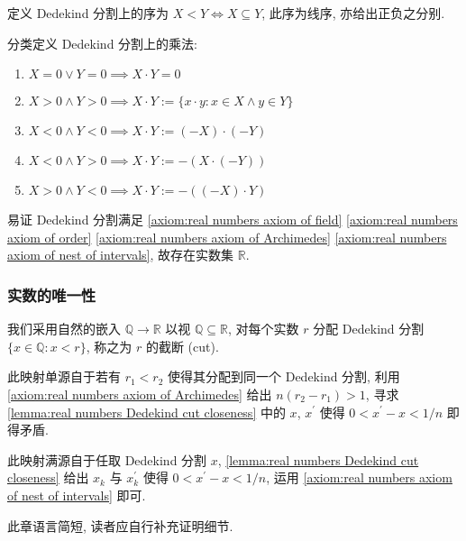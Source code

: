 \begin{definition}
    定义 Dedekind 分割上的序为 \(X < Y \iff X \subseteq Y\), 此序为线序, 亦给出正负之分别.
\end{definition}

\begin{definition}
    分类定义 Dedekind 分割上的乘法:
    \begin{enumerate}
        \item \(X = 0 \lor Y = 0 \implies X \cdot Y = 0\)
        \item \(X > 0 \land Y > 0 \implies X \cdot Y := \{x \cdot y : x \in X \land y \in Y\}\)
        \item \(X < 0 \land Y < 0 \implies X \cdot Y := (-X) \cdot (-Y)\)
        \item \(X < 0 \land Y > 0 \implies X \cdot Y := -(X \cdot (-Y))\)
        \item \(X > 0 \land Y < 0 \implies X \cdot Y := -((-X) \cdot Y)\)
    \end{enumerate}
\end{definition}

\begin{corollary}
    易证 Dedekind 分割满足 \ref{axiom:real numbers axiom of field} \ref{axiom:real numbers axiom of order} \ref{axiom:real numbers axiom of Archimedes} \ref{axiom:real numbers axiom of nest of intervals},
    故存在实数集 \(\mathbb{R}\).
\end{corollary}

\subsubsection{实数的唯一性}

我们采用自然的嵌入 \(\mathbb{Q} \to \mathbb{R}\) 以视 \(\mathbb{Q} \subseteq \mathbb{R}\),
对每个实数 \(r\) 分配 Dedekind 分割 \(\{x \in \mathbb{Q} : x < r\}\), 称之为 \(r\) 的截断 (cut).

此映射单源自于若有 \(r_1 < r_2\) 使得其分配到同一个 Dedekind 分割,
利用 \ref{axiom:real numbers axiom of Archimedes} 给出 \(n (r_2 - r_1) > 1\),
寻求 \ref{lemma:real numbers Dedekind cut closeness} 中的 \(x\), \(x^\prime\) 使得 \(0 < x^\prime - x < 1 / n\) 即得矛盾.

此映射满源自于任取 Dedekind 分割 \(x\), \ref{lemma:real numbers Dedekind cut closeness} 
给出 \(x_k\) 与 \(x_k^\prime\) 使得 \(0 < x^\prime - x < 1 / n\), 运用 \ref{axiom:real numbers axiom of nest of intervals} 即可.

此章语言简短, 读者应自行补充证明细节.
